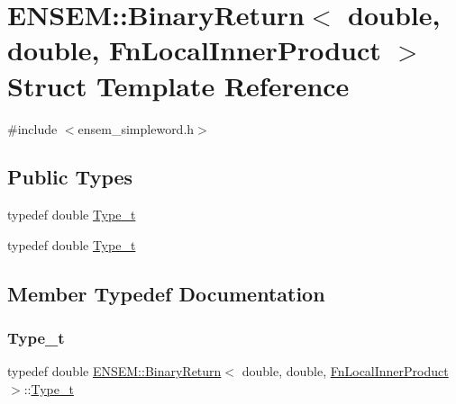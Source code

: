 \hypertarget{structENSEM_1_1BinaryReturn_3_01double_00_01double_00_01FnLocalInnerProduct_01_4}{}\section{E\+N\+S\+EM\+:\+:Binary\+Return$<$ double, double, Fn\+Local\+Inner\+Product $>$ Struct Template Reference}
\label{structENSEM_1_1BinaryReturn_3_01double_00_01double_00_01FnLocalInnerProduct_01_4}


{\ttfamily \#include $<$ensem\+\_\+simpleword.\+h$>$}

\subsection*{Public Types}
\begin{DoxyCompactItemize}
\item 
typedef double \mbox{\hyperlink{structENSEM_1_1BinaryReturn_3_01double_00_01double_00_01FnLocalInnerProduct_01_4_a086cf9ffa1dbc1fba4c959bf0ae38e60}{Type\+\_\+t}}
\item 
typedef double \mbox{\hyperlink{structENSEM_1_1BinaryReturn_3_01double_00_01double_00_01FnLocalInnerProduct_01_4_a086cf9ffa1dbc1fba4c959bf0ae38e60}{Type\+\_\+t}}
\end{DoxyCompactItemize}


\subsection{Member Typedef Documentation}
\mbox{\label{structENSEM_1_1BinaryReturn_3_01double_00_01double_00_01FnLocalInnerProduct_01_4_a086cf9ffa1dbc1fba4c959bf0ae38e60}} 
\subsubsection{\texorpdfstring{Type\_t}{Type\_t}\hspace{0.1cm}{\footnotesize\ttfamily [1/2]}}
{\footnotesize\ttfamily typedef double \mbox{\hyperlink{structENSEM_1_1BinaryReturn}{E\+N\+S\+E\+M\+::\+Binary\+Return}}$<$ double, double, \mbox{\hyperlink{structENSEM_1_1FnLocalInnerProduct}{Fn\+Local\+Inner\+Product}} $>$\+::\mbox{\hyperlink{structENSEM_1_1BinaryReturn_3_01double_00_01double_00_01FnLocalInnerProduct_01_4_a086cf9ffa1dbc1fba4c959bf0ae38e60}{Type\+\_\+t}}}

